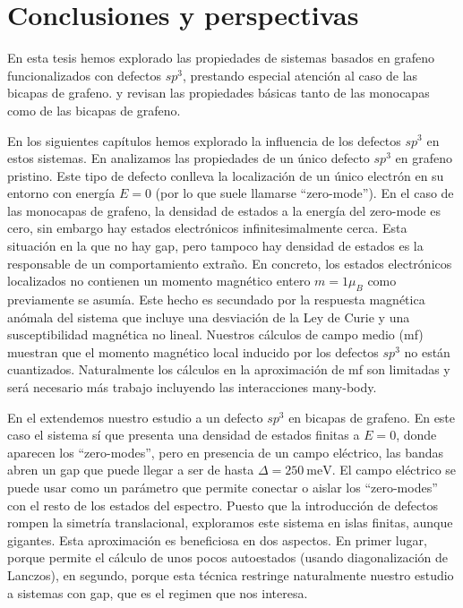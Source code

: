 \chapter{Conclusiones y perspectivas}
\label{conclusions}
En esta tesis hemos explorado las propiedades de sistemas basados en grafeno funcionalizados con defectos $sp^3$, prestando especial atención al caso de las bicapas de grafeno.  y  revisan las propiedades básicas tanto de las monocapas como de las bicapas de grafeno.

En los siguientes capítulos hemos explorado la influencia de los defectos $sp^3$ en estos sistemas. En  analizamos las propiedades de un único defecto $sp^3$ en grafeno pristino. Este tipo de defecto conlleva la localización de un único electrón en su entorno con energía $E=0$ (por lo que suele llamarse ``zero-mode''). En el caso de las monocapas de grafeno, la densidad de estados a la energía del zero-mode es cero, sin embargo hay estados electrónicos infinitesimalmente cerca. Esta situación en la que no hay gap, pero tampoco hay densidad de estados es la responsable de un comportamiento extraño.
En concreto, los estados electrónicos localizados no contienen un momento magnético entero $m=1\mu_B$ como previamente se asumía. Este hecho es secundado por la respuesta magnética anómala del sistema que incluye una desviación de la Ley de Curie y una susceptibilidad magnética no lineal. Nuestros cálculos de campo medio (\ac{mf}) muestran que el momento magnético local inducido por los defectos $sp^3$ no están cuantizados. Naturalmente los cálculos en la aproximación de \ac{mf} son limitadas y será necesario más trabajo incluyendo las interacciones many-body.
\medskip


En el  extendemos nuestro estudio a un defecto $sp^3$ en bicapas de grafeno. En este caso el sistema sí que presenta una densidad de estados finitas a $E=0$, donde aparecen los ``zero-modes'', pero en presencia de un campo eléctrico, las bandas abren un gap que puede llegar a ser de hasta $\Delta=\SI{250}{\meV}$.
El campo eléctrico se puede usar como un parámetro que permite conectar o aislar los ``zero-modes'' con el resto de los estados del espectro.
Puesto que la introducción de defectos rompen la simetría translacional, exploramos este sistema en islas finitas, aunque gigantes. Esta aproximación es beneficiosa en dos aspectos. En primer lugar, porque permite el cálculo de unos pocos autoestados (usando diagonalización de Lanczos), en segundo, porque esta técnica restringe naturalmente nuestro estudio a sistemas con gap, que es el regimen que nos interesa.

